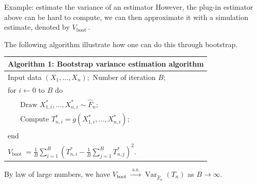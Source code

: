 \documentclass[
  ignorenonframetext,
]{beamer}
\begin{document}
\begin{frame}{Example: estimate the variance of an estimator}
\protect{}\label{example-estimate-the-variance-of-an-estimator-2}
However, the plug-in estimator above can be hard to compute, we can then
approximate it with a simulation estimate, denoted by
\(V_{\text {boot }}\).

The following algorithm illustrate how one can do this through
bootstrap.

\begin{tabular}{l}
\hline Algorithm 1: Bootstrap variance estimation algorithm \\
\hline Input data $\left(X_1, \ldots, X_n\right) ;$ Number of iteration $B ;$ \\
for $i \leftarrow 0$ to $B$ do \\
$\quad \begin{array}{l}\text { Draw } X_{1, i}^*, \ldots, X_{n, i}^* \sim \hat{F}_n ; \\
\text { Compute } T_{n, i}^*=g\left(X_{1, i}^*, \ldots, X_{n, i}^*\right) ;\end{array}$ \\
end \\
$V_{\text {boot }}=\frac{1}{B} \sum_{i=1}^B\left(T_{n, i}^*-\frac{1}{B} \sum_{j=1}^B T_{n, j}^*\right)^2$. \\
\hline \end{tabular}

By law of large numbers, we have
\(V_{\text {boot }} \stackrel{\text { a.s. }}{\longrightarrow} \operatorname{Var}_{\hat{F}_n}\left(T_n\right)\)
as \(B \rightarrow \infty\).
\end{frame}
\end{document}
